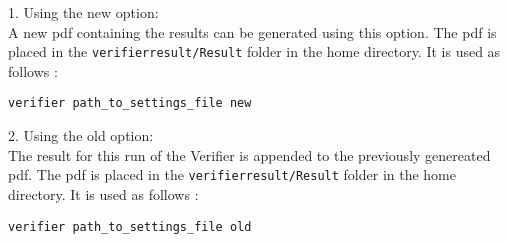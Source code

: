 \documentclass[a4paper]{article}
\begin{document}
1. Using the new option:\\

A new pdf containing the results can be generated using this option. The pdf is placed
in the {\tt verifier\textunderscore result/Result} folder in the home directory. It is used as follows :

\begin{Verbatim}
verifier path_to_settings_file new
\end{Verbatim}
2. Using the old option:
\\
The result for this run of the Verifier is appended to the previously genereated pdf. 
The pdf is placed in the {\tt verifier\textunderscore result/Result} folder in the home directory. 
It is used as follows :

\begin{Verbatim}
verifier path_to_settings_file old
\end{Verbatim}


\pagebreak





{}



\pagebreak
{}
{}

\end{document}
